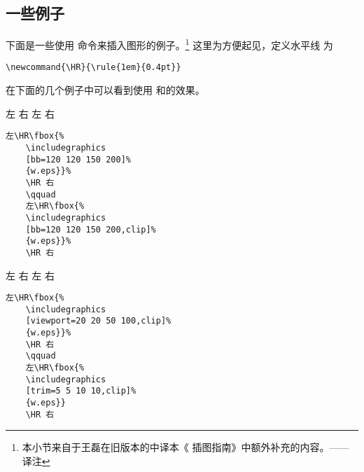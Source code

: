 \subsection{一些例子}

下面是一些使用  命令来插入图形的例子。\footnote{
	本小节来自于王磊在旧版本的中译本《\LaTeXe{} 插图指南》中额外补充的内容。——译注}
这里为方便起见，定义水平线  为
\begin{lstlisting}
\newcommand{\HR}{\rule{1em}{0.4pt}}
\end{lstlisting}

\ifxetex\relax\else\ifpdf\relax\else %
在下面的几个例子中可以看到使用 和的效果。

\hspace{-1cm}\begin{minipage}[c]{.5\textwidth}
	左\HR%
	\HR 右
	\qquad
	左\HR%
	\HR 右
\end{minipage}%
\begin{minipage}[c]{.5\textwidth}
	\begin{Verbatim}[frame=lines,label=\colorbox{green}{\small 例一},labelposition=topline,]
	左\HR\fbox{%
	\includegraphics
	[bb=120 120 150 200]%
	{w.eps}}%
	\HR 右
	\qquad
	左\HR\fbox{%
	\includegraphics
	[bb=120 120 150 200,clip]%
	{w.eps}}%
	\HR 右
	\end{Verbatim}
\end{minipage}

\hspace{-1.5cm}\begin{minipage}[c]{.65\textwidth}
	左\HR\fbox{%
		\texttt{[image: w]}}%
	\HR 右
	\qquad
	左\HR\fbox{%
		\texttt{[image: w]}}%
	\HR 右
\end{minipage}%
\hspace{-1cm}\begin{minipage}[c]{.5\textwidth}
	\begin{Verbatim}[frame=lines,label=\colorbox{green}{\small 例二},labelposition=topline]
	左\HR\fbox{%
	\includegraphics
	[viewport=20 20 50 100,clip]%
	{w.eps}}%
	\HR 右
	\qquad
	左\HR\fbox{%
	\includegraphics
	[trim=5 5 10 10,clip]%
	{w.eps}}
	\HR 右
	\end{Verbatim}
	\par\vspace{0pt}
\end{minipage}
\fi\fi

